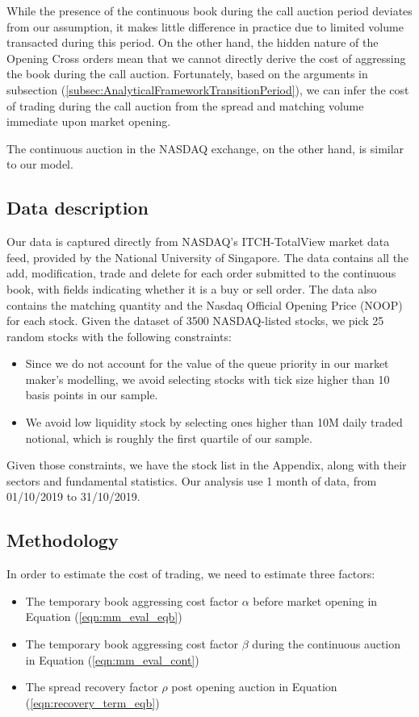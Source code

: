\documentclass{article}
\begin{document}
While the presence of the continuous book during the call auction period deviates from our assumption, it makes little difference in practice due to limited volume transacted during this period. On the other hand, the hidden nature of the Opening Cross orders mean that we cannot directly derive the cost of aggressing the book during the call auction. Fortunately, based on the arguments in subsection (\ref{subsec:AnalyticalFrameworkTransitionPeriod}), we can infer the cost of trading during the call auction from the spread and matching volume immediate upon market opening.

The continuous auction in the NASDAQ exchange, on the other hand, is similar to our model.

\subsection{Data description}

Our data is captured directly from NASDAQ's ITCH-TotalView market data feed, provided by the National University of Singapore. The data contains all the add, modification, trade and delete for each order submitted to the continuous book, with fields indicating whether it is a buy or sell order. The data also contains the matching quantity and the Nasdaq Official Opening Price (NOOP) for each stock. Given the dataset of 3500 NASDAQ-listed stocks, we pick 25 random stocks with the following constraints:
\begin{itemize}
  \item Since we do not account for the value of the queue priority in our market maker's modelling, we avoid selecting stocks with tick size higher than 10 basis points in our sample.
  \item We avoid low liquidity stock by selecting ones higher than 10M daily traded notional, which is roughly the first quartile of our sample.
\end{itemize}

Given those constraints, we have the stock list in the Appendix, along with their sectors and fundamental statistics. Our analysis use 1 month of data, from 01/10/2019 to 31/10/2019.

\subsection{Methodology}

In order to estimate the cost of trading, we need to estimate three factors:
\begin{itemize}
  \item The temporary book aggressing cost factor $\alpha$ before market opening in Equation (\ref{eqn:mm_eval_eqb})
  \item The temporary book aggressing cost factor $\beta$ during the continuous auction in Equation (\ref{eqn:mm_eval_cont})
  \item The spread recovery factor $\rho$ post opening auction in Equation (\ref{eqn:recovery_term_eqb})
\end{itemize}
\end{document}
